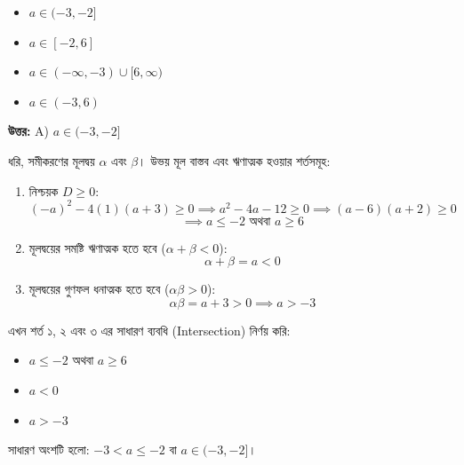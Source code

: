 \documentclass[12pt, a4paper]{article}
\begin{document}
\begin{itemize}[label={}, leftmargin=1cm, itemsep=0.5em]
    \item[\textbf{A)}] $a \in (-3, -2]$
    \item[\textbf{B)}] $a \in [-2, 6]$
    \item[\textbf{C)}] $a \in (-\infty, -3) \cup [6, \infty)$
    \item[\textbf{D)}] $a \in (-3, 6)$
\end{itemize}

\vspace{0.5em}
\begin{tcolorbox}[answerbox]
    \textbf{\color{success} উত্তর:} A) $a \in (-3, -2]$
\end{tcolorbox}
\vspace{1em}

\begin{tcolorbox}[solutionbox={সমাধান (Solution)}]
    \noindent
    ধরি, সমীকরণের মূলদ্বয় $\alpha$ এবং $\beta$। উভয় মূল বাস্তব এবং ঋণাত্মক হওয়ার শর্তসমূহ:
    \begin{enumerate}
        \item নিশ্চয়ক $D \ge 0$:
        \[ (-a)^2 - 4(1)(a+3) \ge 0 \implies a^2 - 4a - 12 \ge 0 \implies (a-6)(a+2) \ge 0 \]
        \[ \implies a \le -2 \text{ অথবা } a \ge 6 \]
        \item মূলদ্বয়ের সমষ্টি ঋণাত্মক হতে হবে ($\alpha+\beta < 0$):
        \[ \alpha+\beta = a < 0 \]
        \item মূলদ্বয়ের গুণফল ধনাত্মক হতে হবে ($\alpha\beta > 0$):
        \[ \alpha\beta = a+3 > 0 \implies a > -3 \]
    \end{enumerate}
    এখন শর্ত ১, ২ এবং ৩ এর সাধারণ ব্যবধি (Intersection) নির্ণয় করি:
    \begin{itemize}
        \item $a \le -2$ অথবা $a \ge 6$
        \item $a < 0$
        \item $a > -3$
    \end{itemize}
    সাধারণ অংশটি হলো: $-3 < a \le -2$ বা $a \in (-3, -2]$।
\end{tcolorbox}

\vspace{1em}
\end{document}
